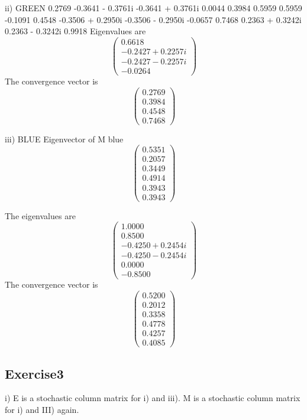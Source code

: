 \documentclass{article} %
\begin{document}
ii) GREEN
   0.2769            -0.3641 - 0.3761i  -0.3641 + 0.3761i   0.0044          
   0.3984             0.5959             0.5959            -0.1091          
   0.4548            -0.3506 + 0.2950i  -0.3506 - 0.2950i  -0.0657          
   0.7468             0.2363 + 0.3242i   0.2363 - 0.3242i   0.9918          
Eigenvalues are 
   \[ \left( \begin{array}{c}   
   0.6618          \\
  -0.2427 + 0.2257i \\
  -0.2427 - 0.2257i \\
  -0.0264     \end{array} \right)\]       
The convergence vector is
   \[ \left( \begin{array}{c}   
    0.2769 \\
    0.3984 \\
    0.4548 \\
    0.7468   \end{array} \right)\]    
    
    
 iii)
BLUE
Eigenvector of M blue
   \[ \left( \begin{array}{c}  
   0.5351        \\
   0.2057           \\
   0.3449             \\       
   0.4914          \\
   0.3943          \\   
   0.3943      \end{array} \right)\] 

The eigenvalues are
   \[ \left( \begin{array}{c}  
   1.0000          \\
   0.8500          \\
  -0.4250 + 0.2454i\\
  -0.4250 - 0.2454i\\
   0.0000          \\
  -0.8500          \end{array} \right)\]    
The convergence vector is
   \[ \left( \begin{array}{c}   
    0.5200\\
    0.2012\\
    0.3358\\
    0.4778\\
    0.4257\\
    0.4085\end{array} \right)\]    
\subsection{Exercise3}
i)
E is a stochastic column matrix for i) and iii).
M is a stochastic column matrix for i) and III) again.
\end{document}
